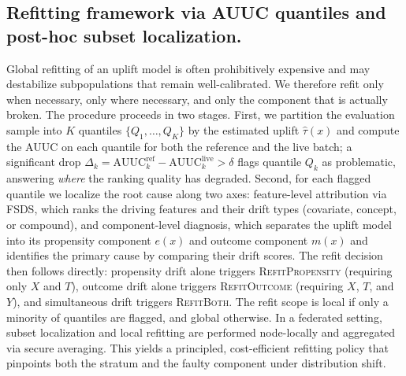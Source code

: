 \documentclass{article}
\begin{document}
\subsection{Refitting framework via AUUC quantiles and post-hoc subset localization.}
Global refitting of an uplift model is often prohibitively expensive and may destabilize subpopulations that remain well-calibrated. We therefore refit only when necessary, only where necessary, and only the component that is actually broken. The procedure proceeds in two stages. First, we partition the evaluation sample into $K$ quantiles $\{Q_1,\dots,Q_K\}$ by the estimated uplift $\hat{\tau}(x)$ and compute the AUUC on each quantile for both the reference and the live batch; a significant drop $\Delta_k = \mathrm{AUUC}_k^{\mathrm{ref}} - \mathrm{AUUC}_k^{\mathrm{live}} > \delta$ flags quantile $Q_k$ as problematic, answering \emph{where} the ranking quality has degraded. Second, for each flagged quantile we localize the root cause along two axes: feature-level attribution via FSDS, which ranks the driving features and their drift types (covariate, concept, or compound), and component-level diagnosis, which separates the uplift model into its propensity component $e(x)$ and outcome component $m(x)$ and identifies the primary cause by comparing their drift scores. The refit decision then follows directly: propensity drift alone triggers \textsc{RefitPropensity} (requiring only $X$ and $T$), outcome drift alone triggers \textsc{RefitOutcome} (requiring $X$, $T$, and $Y$), and simultaneous drift triggers \textsc{RefitBoth}. The refit scope is local if only a minority of quantiles are flagged, and global otherwise. In a federated setting, subset localization and local refitting are performed node-locally and aggregated via secure averaging. This yields a principled, cost-efficient refitting policy that pinpoints both the stratum and the faulty component under distribution shift.
\end{document}
